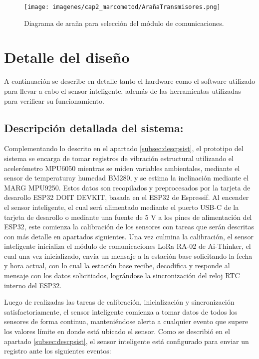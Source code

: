 \begin{figure}[H]
    \centering
    \texttt{[image: imagenes/cap2\_marcometod/ArañaTransmisores.png]}
    \caption{Diagrama de araña para selección del módulo de comunicaciones.}
    \label{fig:arañacomm}
\end{figure}




\section{Detalle del diseño} A continuación se describe en detalle tanto el hardware como el software utilizado para llevar a cabo el sensor inteligente, además de las herramientas utilizadas para verificar su funcionamiento.


\subsection{Descripción detallada del sistema:}
\label{subsec:descripcion}

Complementando lo descrito en el apartado \ref{subsec:descpsist}, el prototipo del sistema se encarga de tomar registros de vibración estructural utilizando el acelerómetro MPU6050 mientras se miden variables ambientales, mediante el sensor de temperaturay humedad BM280, y se estima la inclinación mediante el MARG MPU9250. Estos datos son recopilados y preprocesados por la tarjeta de desarollo ESP32 DOIT DEVKIT, basada en el ESP32 de Espressif. Al encender el sensor inteligente, el cual será alimentado mediante el puerto USB-C de la tarjeta de desarollo o mediante una fuente de 5 V a los pines de alimentación del ESP32, este comienza la calibración de los sensores con tareas que serán descritas con más detalle en apartados siguientes. Una vez culmina la calibración, el sensor inteligente inicializa el módulo de comunicaciones LoRa RA-02 de Ai-Thinker, el cual una vez inicializado, envía un mensaje a la estación base solicitando la fecha y hora actual, con lo cual la estación base recibe, decodifica y responde al mensaje con los datos solicitiados, lográndose la sincronización del reloj RTC interno del ESP32.

Luego de realizadas las tareas de calibración, inicialización y sincronización satisfactoriamente, el sensor inteligente comienza a tomar datos de todos los sensores de forma continua, manteniéndose alerta a cualquier evento que supere los valores límite en donde está ubicado el sensor. Como se describió en el apartado \ref{subsec:descpsist}, el sensor inteligente está configurado para enviar un registro ante los siguientes eventos:


